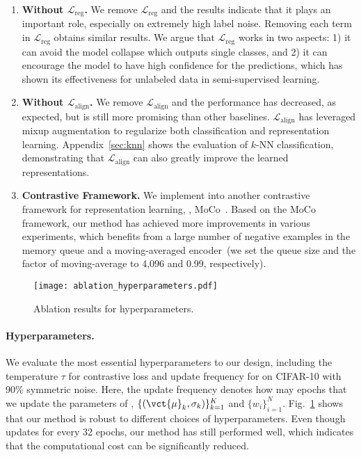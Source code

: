 \begin{enumerate}[label=\color{red!70!black}(\roman*),wide,labelindent=0pt,itemsep=0ex,parsep=0pt,topsep=0pt]
\item\label{bl_4} \textbf{Without $\mathcal{L}_{\mathrm{reg}}$.}\quad
We remove $\mathcal{L}_{\mathrm{reg}}$ and the results indicate that it plays an important role, especially on extremely high label noise. Removing each term in $\mathcal{L}_{\mathrm{reg}}$ obtains similar results. We argue that $\mathcal{L}_{\mathrm{reg}}$ works in two aspects: 1) it can avoid the model collapse which outputs single classes, and 2) it can encourage the model to have high confidence for the predictions, which has shown its effectiveness for unlabeled data in semi-supervised learning.
\item\label{bl_5} \textbf{Without $\mathcal{L}_{\mathrm{align}}$.}\quad 
We remove $\mathcal{L}_{\mathrm{align}}$ and the performance has decreased, as expected, but is still more promising than other baselines. $\mathcal{L}_{\mathrm{align}}$ has leveraged mixup augmentation to regularize both classification and representation learning. Appendix~\ref{sec:knn} shows the evaluation of $k$-NN classification, demonstrating that $\mathcal{L}_{\mathrm{align}}$ can also greatly improve the learned representations.
\item\label{bl_6} \textbf{Contrastive Framework.}\quad
We implement \methodname into another contrastive framework for representation learning, \ie, MoCo~\cite{he2020momentum}. Based on the MoCo framework, our method has achieved more improvements in various experiments, which benefits from a large number of negative examples in the memory queue and a moving-averaged encoder~(we set the queue size and the factor of moving-average to 4,096 and 0.99, respectively).

\end{enumerate}


\begin{figure}
    \centering
    \texttt{[image: ablation\_hyperparameters.pdf]}
    \caption{
        Ablation results for hyperparameters.
    }
    \label{fig:ablation_hyperparameters}\end{figure}

\paragraph{Hyperparameters.}
We evaluate the most essential hyperparameters  to our design, including the temperature $\tau$ for contrastive loss and update frequency for \methodname on CIFAR-10 with 90\% symmetric noise. Here, the update frequency denotes how may epochs that we update the parameters of \methodname, $\{(\vct{\mu}_k, \sigma_k)\}_{k=1}^K$ and $\{w_i\}_{i=1}^N$.
Fig.~\ref{fig:ablation_hyperparameters} shows that our method is robust to different choices of hyperparameters.
Even though \methodname updates for every 32 epochs, our method has still performed well, which indicates that the computational cost can be significantly reduced.

